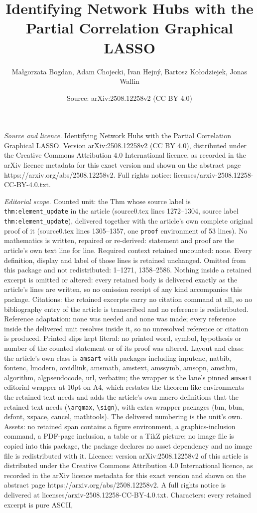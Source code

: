 \documentclass[10pt,a4paper]{amsart}
\title[Identifying Network Hubs with the Partial Correlation Graphi]{Identifying Network Hubs with the Partial Correlation Graphical LASSO}
\author{Ma{\l}gorzata Bogdan, Adam Chojecki, Ivan Hejn\'y, Bartosz Ko{\l}odziejek, Jonas Wallin}
\date{Source: arXiv:2508.12258v2 (CC BY 4.0)}
\begin{document}
\maketitle

\noindent\emph{Source and licence.} Identifying Network Hubs with the Partial Correlation Graphical LASSO. Version arXiv:2508.12258v2 (CC BY 4.0), distributed under the Creative Commons Attribution 4.0 International licence, as recorded in the arXiv licence metadata for this exact version and shown on the abstract page https://arxiv.org/abs/2508.12258v2. Full rights notice: licenses/arxiv-2508.12258-CC-BY-4.0.txt.\par\smallskip

\noindent\textit{Editorial scope.} Counted unit: the Thm whose source label is \texttt{thm:element\_update} in the article (source0.tex lines 1272--1304, source label \texttt{thm:element\_update}), delivered together with the article's own complete original proof of it (source0.tex lines 1305--1357, one \texttt{proof} environment of 53 lines). No mathematics is written, repaired or re-derived: statement and proof are the article's own text line for line. Required context retained uncounted: none. Every definition, display and label of those lines is retained unchanged. Omitted from this package and not redistributed: 1--1271, 1358--2586. Nothing inside a retained excerpt is omitted or altered: every retained body is delivered exactly as the article's lines are written, so no omission receipt of any kind accompanies this package. Citations: the retained excerpts carry no citation command at all, so no bibliography entry of the article is transcribed and no reference is redistributed. Reference adaptation: none was needed and none was made; every reference inside the delivered unit resolves inside it, so no unresolved reference or citation is produced. Printed slips kept literal: no printed word, symbol, hypothesis or number of the counted statement or of its proof was altered. Layout and class: the article's own class is \texttt{amsart} with packages including inputenc, natbib, fontenc, lmodern, orcidlink, amsmath, amstext, amssymb, amsopn, amsthm, algorithm, algpseudocode, url, verbatim; the wrapper is the lane's pinned \texttt{amsart} editorial wrapper at 10pt on A4, which restates the theorem-like environments the retained text needs and adds the article's own macro definitions that the retained text needs (\texttt{\textbackslash argmax}, \texttt{\textbackslash sign}), with extra wrapper packages (bm, bbm, dsfont, xspace, cancel, mathtools). The delivered numbering is the unit's own. Assets: no retained span contains a figure environment, a graphics-inclusion command, a PDF-page inclusion, a table or a TikZ picture; no image file is copied into this package, the package declares no asset dependency and no image file is redistributed with it. Licence: version arXiv:2508.12258v2 of this article is distributed under the Creative Commons Attribution 4.0 International licence, as recorded in the arXiv licence metadata for this exact version and shown on the abstract page https://arxiv.org/abs/2508.12258v2. A full rights notice is delivered at licenses/arxiv-2508.12258-CC-BY-4.0.txt. Characters: every retained excerpt is pure ASCII, 
\end{document}
